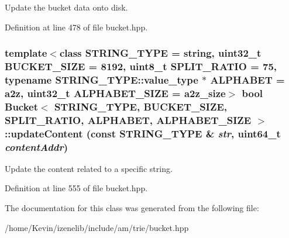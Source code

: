 Update the bucket data onto disk. 

Definition at line 478 of file bucket.hpp.\hypertarget{classBucket_9aef14ec50558bf257172ed9ace35347}{
\subsubsection[{updateContent}]{\setlength{\rightskip}{0pt plus 5cm}template$<$class STRING\_\-TYPE  = string, uint32\_\-t BUCKET\_\-SIZE = 8192, uint8\_\-t SPLIT\_\-RATIO = 75, typename STRING\_\-TYPE::value\_\-type $\ast$ ALPHABET = a2z, uint32\_\-t ALPHABET\_\-SIZE = a2z\_\-size$>$ bool {\bf Bucket}$<$ STRING\_\-TYPE, BUCKET\_\-SIZE, SPLIT\_\-RATIO, ALPHABET, ALPHABET\_\-SIZE $>$::updateContent (const STRING\_\-TYPE \& {\em str}, \/  uint64\_\-t {\em contentAddr})}}
\label{classBucket_9aef14ec50558bf257172ed9ace35347}


Update the content related to a specific string. 

Definition at line 555 of file bucket.hpp.

The documentation for this class was generated from the following file:\begin{CompactItemize}
\item 
/home/Kevin/izenelib/include/am/trie/bucket.hpp\end{CompactItemize}
